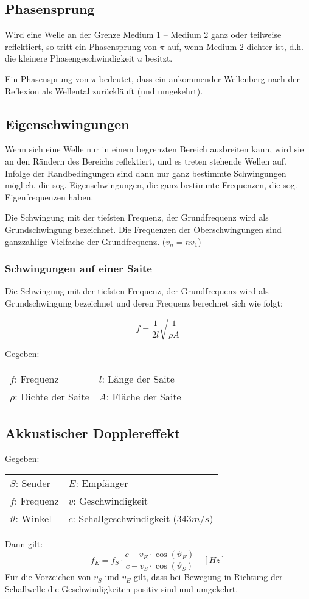 \subsection{Phasensprung}

Wird eine Welle an der Grenze Medium 1 -- Medium 2 ganz oder teilweise
reflektiert, so tritt ein Phasensprung von $\pi$ auf, wenn Medium 2 dichter ist,
d.h. die kleinere Phasengeschwindigkeit $u$ besitzt.

Ein Phasensprung von $\pi$ bedeutet, dass ein ankommender Wellenberg nach der
Reflexion als Wellental zurückläuft (und umgekehrt).

\subsection{Eigenschwingungen}

Wenn sich eine Welle nur in einem begrenzten Bereich ausbreiten kann, wird sie
an den Rändern des Bereichs reflektiert, und es treten stehende Wellen auf. Infolge
der Randbedingungen sind dann nur ganz bestimmte Schwingungen möglich, die
sog. Eigenschwingungen, die ganz bestimmte Frequenzen, die sog. Eigenfrequenzen
haben.

Die Schwingung mit der tiefsten Frequenz, der Grundfrequenz wird als Grundschwingung bezeichnet. Die Frequenzen der Oberschwingungen sind
ganzzahlige Vielfache der Grundfrequenz. ($v_n = nv_1$)

\subsubsection{Schwingungen auf einer Saite}

Die Schwingung mit der tiefsten Frequenz, der Grundfrequenz wird als Grundschwingung bezeichnet und deren Frequenz berechnet sich wie folgt:

\[
		f = \frac{1}{2l} \sqrt{\frac{1}{\rho A}}
\]

Gegeben:

\begin{tabular}{ll}
$f$: Frequenz & $l$: Länge der Saite \\
$\rho$: Dichte der Saite & $A$: Fläche der Saite \\
\end{tabular}

\subsection{Akkustischer Dopplereffekt}

Gegeben:

\begin{tabular}{ll}
$S$: Sender & $E$: Empfänger \\
$f$: Frequenz & $v$: Geschwindigkeit \\
$\vartheta$: Winkel & $c$: Schallgeschwindigkeit ($343 m/s$) \\
\end{tabular}

Dann gilt:
\[
	f_E = f_S \cdot \frac{c - v_E \cdot \cos(\vartheta_E)}{c - v_S \cdot \cos (\vartheta_S)}
	\quad \left[ Hz \right]
\]
Für die Vorzeichen von $v_S$ und $v_E$ gilt, dass bei Bewegung in Richtung der
Schallwelle die Geschwindigkeiten positiv sind und umgekehrt.
